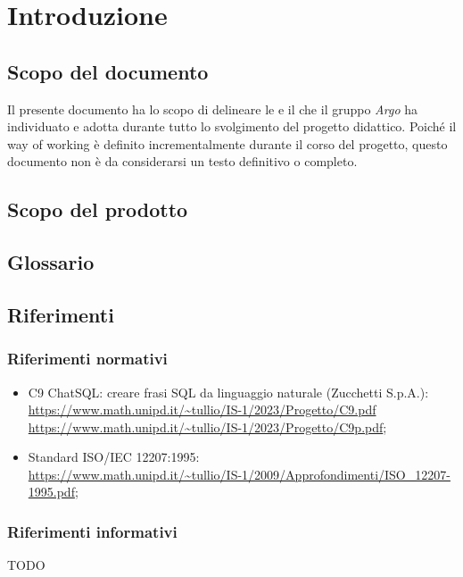 \section{Introduzione}

\subsection{Scopo del documento}
Il presente documento ha lo scopo di delineare le  e il  che il gruppo \textit{Argo} ha individuato e adotta durante tutto lo svolgimento del progetto didattico. Poiché il way of working è definito incrementalmente durante il corso del progetto, questo documento non è da considerarsi un testo definitivo o completo.

\subsection{Scopo del prodotto}
\ScopoDelProdotto


\subsection{Glossario}
\GlossarioIntroduzione


\subsection{Riferimenti}

\subsubsection{Riferimenti normativi}
\begin{itemize}
  \item C9 ChatSQL: creare frasi SQL da linguaggio naturale (Zucchetti S.p.A.):\\ \url{https://www.math.unipd.it/~tullio/IS-1/2023/Progetto/C9.pdf}\\ \url{https://www.math.unipd.it/~tullio/IS-1/2023/Progetto/C9p.pdf};
  \item Standard ISO/IEC 12207:1995:\\ \url{https://www.math.unipd.it/~tullio/IS-1/2009/Approfondimenti/ISO_12207-1995.pdf};
\end{itemize}

\subsubsection{Riferimenti informativi}
TODO